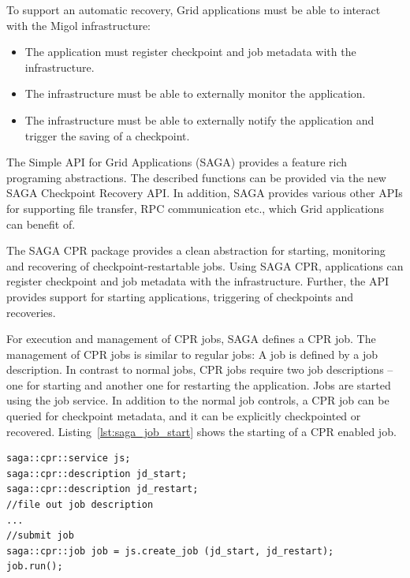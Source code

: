 \documentclass[times, 10pt,twocolumn]{article}
\begin{document}
To support an automatic recovery, Grid applications must be able to interact with the Migol infrastructure:
\begin{itemize}
    \item The application must register checkpoint and job metadata with the infrastructure.
    \item The infrastructure must be able to externally monitor the application.
    \item The infrastructure must be able to externally notify the application and trigger the saving of a checkpoint.
\end{itemize}  
The Simple API for Grid Applications (SAGA) provides a feature rich programing abstractions. The described functions 
can be  provided via the new SAGA Checkpoint Recovery API. In addition, SAGA provides  
various other APIs for supporting file transfer, RPC communication etc., which Grid applications can benefit of.                           


                                                                                                         
The SAGA CPR package provides a clean abstraction for starting,
monitoring and recovering of checkpoint-restartable jobs.
Using SAGA CPR, applications can register checkpoint and job metadata with the infrastructure. 
Further, the API provides support for starting applications, triggering of checkpoints and recoveries.  

For execution and management of CPR jobs, SAGA defines a CPR job. The management of 
CPR jobs is similar to regular jobs: A job is defined by a job description. In contrast to normal jobs, 
CPR jobs require  two job descriptions -- one for starting and another one for restarting the application.
Jobs are started using the job service. In addition to the normal job controls, a CPR job can be queried for checkpoint metadata, and 
it can be explicitly checkpointed or recovered. Listing~\ref{lst:saga_job_start} shows the starting of a CPR enabled job.

\begin{lstlisting}[style=myListing, caption={SAGA CPR: Starting a Job with CPR Support},  label={lst:saga_job_start}]
saga::cpr::service js; 
saga::cpr::description jd_start;
saga::cpr::description jd_restart;
//file out job description
...
//submit job  
saga::cpr::job job = js.create_job (jd_start, jd_restart);
job.run();
\end{lstlisting}
    
\end{document}
